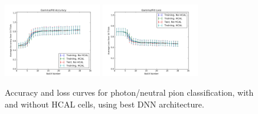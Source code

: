 \begin{figure}[htbp]
\centering
\includegraphics[width=0.38\textwidth]{Images/Calo/HCAL_study_gammapi0_accuracy.png}
\includegraphics[width=0.38\textwidth]{Images/Calo/HCAL_study_gammapi0_loss.png}
\caption{Accuracy and loss curves for photon/neutral pion classification, with and without HCAL cells, using best DNN architecture.}
\label{fig:HCAL_study_gammapi0}
\end{figure}